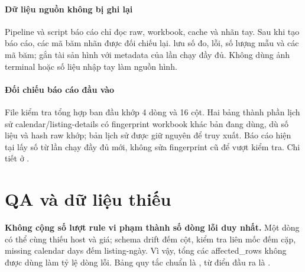 \documentclass[11pt,a4paper]{article}
\begin{document}
\paragraph{Dữ liệu nguồn không bị ghi lại} Pipeline và script báo cáo chỉ đọc raw, workbook, cache và nhãn tay. Sau khi tạo báo cáo, các mã băm nhãn được đối chiếu lại.  lưu số đo, lỗi, số lượng mẫu và các mã băm;  gắn tài sản hình với metadata của lần chạy đầy đủ. Không dùng ảnh terminal hoặc số liệu nhập tay làm nguồn hình.

\paragraph{Đối chiếu báo cáo đầu vào} File kiểm tra tổng hợp ban đầu khớp 4 dòng và 16 cột. Hai bảng thành phần lịch sử calendar/listing-details có fingerprint workbook khác bản đang dùng, dù số liệu và hash raw khớp; bản lịch sử được giữ nguyên để truy xuất. Báo cáo hiện tại lấy số từ lần chạy đầy đủ mới, không sửa fingerprint cũ để vượt kiểm tra. Chi tiết ở .

\section{QA và dữ liệu thiếu}
\textbf{Không cộng số lượt rule vi phạm thành số dòng lỗi duy nhất.} Một dòng có thể cùng thiếu host và giá; schema drift đếm cột, kiểm tra liên mốc đếm cặp, missing calendar days đếm listing-ngày. Vì vậy, tổng các affected\_rows không được dùng làm tỷ lệ dòng lỗi. Bảng quy tắc chuẩn là , từ điển đầu ra là .
\end{document}
